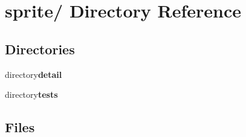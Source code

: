 \section{sprite/ Directory Reference}
\label{dir_000000}
\subsection*{Directories}
\begin{CompactItemize}
\item 
directory{\bf detail}
\item 
directory{\bf tests}
\end{CompactItemize}
\subsection*{Files}
